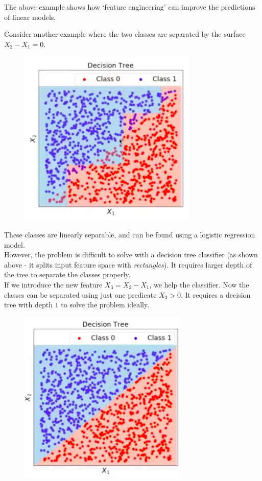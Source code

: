 The above example shows how `feature engineering' can improve the predictions of linear models.




\newpage
\begin{frameex}
Consider another example where the two classes are separated by the surface $X_2 - X_1 = 0$. 
\begin{figure}[H]
\centering
\includegraphics[scale=0.4]{treeline.png}
\end{figure}
These classes are linearly separable, and can be found using a logistic regression model.\\

However, the problem is difficult to solve with a decision tree classifier (as shown above - it splits input feature space with \textit{rectangles}). It requires larger depth of the tree to separate the classes properly.\\

If we introduce the new feature $X_3 = X_2 - X_1$, we help the classifier. Now the classes can be separated using just one predicate $X_3 > 0$. It requires a decision tree with depth $1$ to solve the problem ideally.

\begin{figure}[H]
\centering
\includegraphics[scale=0.4]{treeline2.png}
\end{figure}
\end{frameex}

